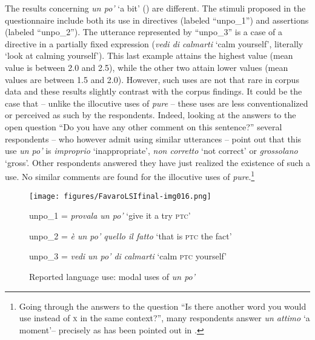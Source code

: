 The results concerning \textit{un po’} ‘a bit’ () are different. The stimuli proposed in the questionnaire include both its use in directives (labeled “unpo\_1”) and assertions (labeled “unpo\_2”). The utterance represented by “unpo\_3” is a case of a directive in a partially fixed expression (\textit{vedi di calmarti} ‘calm yourself’, literally ‘look at calming yourself’). This last example attains the highest value (mean value is between 2.0 and 2.5), while the other two attain lower values (mean values are between 1.5 and 2.0). However, such uses are not that rare in corpus data and these results slightly contrast with the corpus findings. It could be the case that – unlike the illocutive uses of \textit{pure} – these uses are less conventionalized or perceived as such by the respondents. Indeed, looking at the answers to the open question “Do you have any other comment on this sentence?” several respondents – who however admit using similar utterances – point out that this use \textit{un po’} is \textit{improprio} ‘inappropriate’, \textit{non corretto} ‘not correct’ or \textit{grossolano} ‘gross’. Other respondents answered they have just realized the existence of such a use. No similar comments are found for the illocutive uses of \textit{pure}.\footnote{Going through the answers to the question “Is there another word you would use instead of \textsc{x} in the same context?”, many respondents  answer \textit{un attimo} ‘a moment’– precisely as has been pointed out in .}


\begin{figure}[t]
\texttt{[image: figures/FavaroLSIfinal-img016.png]}

{\raggedright\small
unpo\_1 = \textit{provala un po’} ‘give it a try \textsc{ptc}’

unpo\_2 = \textit{è un po’ quello il fatto} ‘that is \textsc{ptc} the fact’

unpo\_3 = \textit{vedi un po’ di calmarti} ‘calm \textsc{ptc} yourself’\par}

\caption{\label{fig:key:9.3} Reported language use: modal uses of \textit{un po’}}
\end{figure}

